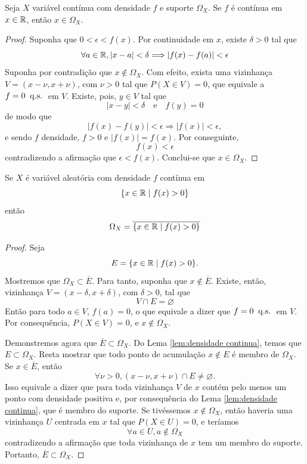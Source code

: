 \begin{lem:densidade continua}
\label{lem:densidade continua}
Seja $X$ variável contínua com densidade $f$ e suporte $\Omega_X$.
Se $f$ é contínua em $x \in \mathbb{R}$, então $x \in \Omega_X$.
\begin{proof}
	Suponha que $0 < \epsilon < f(x)$. Por continuidade em $x$, existe $\delta > 0$ tal que
	\[
		\forall a \in \mathbb{R}, |x-a| < \delta \Longrightarrow |f(x)-f(a)| < \epsilon
	\]
	Suponha por contradição que $x \notin \Omega_X$.
	Com efeito, exista uma vizinhança $V = (x-\nu, x+\nu)$, com $\nu > 0$
	tal que $P(X \in V) = 0$, que equivale a $f=0 \;\;\mathrm{q.s.}\;$ em $V$.
	Existe, pois, $y \in V$ tal que
	\[
		|x-y| < \delta \quad \text{e} \quad f(y) = 0
	\]
	de modo que
	\[
		|f(x) - f(y)| < \epsilon \Longrightarrow |f(x)| < \epsilon,
	\]
	e sendo $f$ densidade, $f > 0$ e $|f(x)| = f(x)$.
	Por conseguinte,
	\[
		f(x) < \epsilon
	\]
	contradizendo a afirmação que $\epsilon < f(x)$.
	Conclui-se que $x \in \Omega_X$.
\end{proof}
\end{lem:densidade continua}

\begin{thm:suporte continua}
\label{thm:suporte continua}
Se $X$ é variável aleatória com densidade $f$ contínua em
\[
	\{x \in \mathbb{R} \mid f(x) > 0\}
\]
então
\[
	\Omega_X = \overline{\{x \in \mathbb{R} \mid f(x) > 0\}}
\]
\begin{proof}
	Seja
	\[
		E = \{x \in \mathbb{R} \mid f(x) > 0\}.
	\]
	Mostremos que $\Omega_X \subset \overline E$.
	Para tanto, suponha que $x \notin \overline E$.
	Existe, então, vizinhança $V = (x-\delta, x+\delta)$, com $\delta > 0$, tal que
	\[
		V \cap E = \varnothing
	\]
	Então para todo $a \in V$, $f(a) = 0$, o que equivale a dizer que $f = 0 \;\;\mathrm{q.s.}\;$ em $V$.
	Por consequência, $P(X \in V) = 0$, e $x \notin \Omega_X$.

	Demonstremos agora que $\overline E \subset \Omega_X$.
	Do Lema \ref{lem:densidade continua}, temos que $E \subset \Omega_X$.
	Resta mostrar que todo ponto de acumulação $x \notin E$ é membro de $\Omega_X$.
	Se $x \in \overline E$, então
	\[
		\forall \nu > 0, (x-\nu, x+\nu) \cap E \ne \varnothing.
	\]
	Isso equivale a dizer que para toda vizinhança $V$ de $x$ contém pelo menos
	um ponto com densidade positiva e, por consequência do Lema \ref{lem:densidade continua},
	que é membro do suporte.
	Se tivéssemos $x \notin \Omega_X$, então haveria uma vizinhança $U$
	centrada em $x$ tal que $P(X \in U) = 0$, e teríamos
	\[
		\forall a \in U, a \notin \Omega_X
	\]
	contradizendo a afirmação que toda vizinhança de $x$ tem um membro do suporte.
	Portanto, $\overline E \subset \Omega_X$.
\end{proof}
\end{thm:suporte continua}

